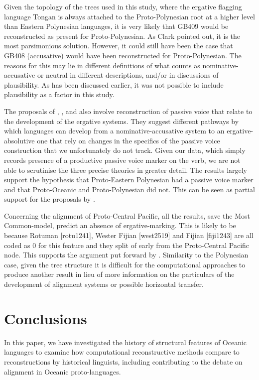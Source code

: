 \documentclass[a4paper,10pt]{article} %
\begin{document}
Given the topology of the trees used in this study, where the ergative flagging language Tongan is always attached to the Proto-Polynesian root at a higher level than Eastern Polynesian languages, it is very likely that GB409 would be reconstructed as present for Proto-Polynesian. As Clark pointed out, it is the most parsimonious solution. However, it could still have been the case that GB408 (accusative) would have been reconstructed for Proto-Polynesian. The reasons for this may lie in different definitions of what counts as nominative-accusative or neutral in different descriptions, and/or in discussions of plausibility. As has been discussed earlier, it was not possible to include plausibility as a factor in this study.

The proposals of \citet{hale_1968}, \citet{hohepa_1967, hohepa_1969}, and \citet{chung1978} also involve reconstruction of passive voice that relate to the development of the ergative systems. They suggest different pathways by which languages can develop from a nominative-accusative system to an ergative-absolutive one that rely on changes in the specifics of the passive voice construction that we unfortunately do not track. Given our data, which simply records presence of a productive passive voice marker on the verb, we are not able to scrutinise the three precise theories in greater detail. The results largely support the hypothesis that Proto-Eastern Polynesian had a passive voice marker and that Proto-Oceanic and Proto-Polynesian did not. This can be seen as partial support for the proposals by \citet{hale_1968, hohepa_1967, hohepa_1969, chung1978}.

Concerning the alignment of Proto-Central Pacific, all the results, save the Most Common-model, predict an absence of ergative-marking. This is likely to be because Rotuman [rotu1241], Wester Fijian [west2519] and Fijian [fiji1243] are all coded as 0 for this feature and they split of early from the Proto-Central Pacific node. This supports the argument put forward by \citet{ball2007ergativity}. Similarity to the Polynesian case, given the tree structure it is difficult for the computational approaches to produce another result in lieu of more information on the particulars of the development of alignment systems or possible horizontal transfer.

\section{Conclusions}
In this paper, we have investigated the history of structural features of Oceanic languages to examine how computational reconstructive methods compare to reconstructions by historical linguists, including contributing to the debate on  alignment in Oceanic proto-languages.
\end{document}
